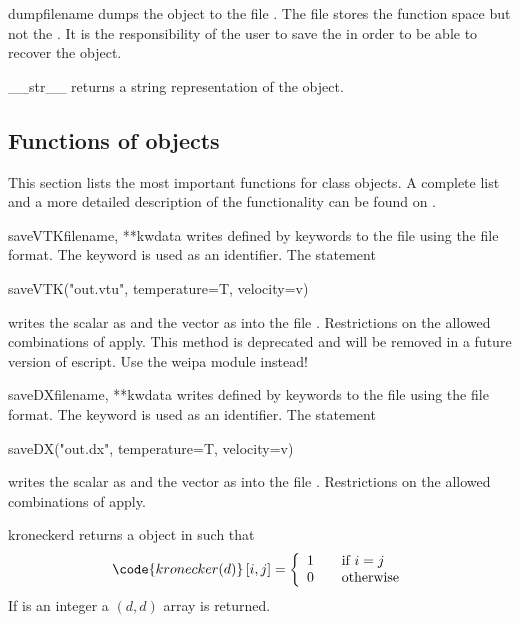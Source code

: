 \begin{methoddesc}[Data]{dump}{filename}
dumps the \Data object to the file . The file stores the
function space but not the \Domain. It is the responsibility of the user to
save the \Domain in order to be able to recover the \Data object.
\end{methoddesc}

\begin{methoddesc}[Data]{__str__}{}
returns a string representation of the object.
\end{methoddesc}

\subsection{Functions of \Data objects}
This section lists the most important functions for \Data class objects.
A complete list and a more detailed description of the functionality can be
found on \ReferenceGuide.

\begin{funcdesc}{saveVTK}{filename, **kwdata}
writes \Data defined by keywords to the file  using the \VTK
file format. The keyword is used as an identifier. The statement
\begin{python}
        saveVTK("out.vtu", temperature=T, velocity=v)
\end{python}
writes the scalar  as  and the vector  as
 into the file .
Restrictions on the allowed combinations of \FunctionSpace apply.
This method is deprecated and will be removed in a future version of escript.
Use the weipa module instead!
\end{funcdesc}

\begin{funcdesc}{saveDX}{filename, **kwdata}
writes \Data defined by keywords to the file  using the \OpenDX
file format. The keyword is used as an identifier. The statement
\begin{python}
        saveDX("out.dx", temperature=T, velocity=v)
\end{python}
writes the scalar  as  and the vector  as
 into the file .
Restrictions on the allowed combinations of \FunctionSpace apply.
\end{funcdesc}

\begin{funcdesc}{kronecker}{d}
returns a \RankTwo \Data object in \FunctionSpace {} such that
\begin{equation}
\code{kronecker(d)}\left[ i,j\right] = \left\{
\begin{array}{l l}
    1 & \quad \text{if $i=j$}\\
    0 & \quad \text{otherwise}
\end{array}
\right.
\end{equation}
If  is an integer a $(d,d)$ \numpy array is returned.
\end{funcdesc}

